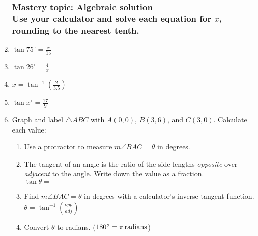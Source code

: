 \documentclass[12pt, twoside]{article}
\begin{document}
\begin{enumerate}
\subsubsection*{Mastery topic: Algebraic solution\\[0.5cm]
Use your calculator and solve each equation for $x$, rounding to the nearest tenth.}
\item $\displaystyle \tan 75^\circ = \frac{x}{15}$ \vspace{3cm}
\item $\displaystyle \tan 26^\circ = \frac{4}{x}$ \vspace{4cm}
\item $\displaystyle x = \tan^{-1} (\frac{2}{3.5})$ \vspace{3cm}
\item $\displaystyle \tan x^\circ = \frac{17}{9}$ \vspace{3cm}

\newpage
\item Graph and label $\triangle ABC$ with $A(0,0)$, $B(3,6)$, and $C(3,0)$. Calculate each value:
  \begin{enumerate}[itemsep=1.25cm]  
    \item Use a protractor to measure $m\angle BAC= \theta$ in degrees.
    \item The tangent of an angle is the ratio of the side lengths \emph{opposite} over \emph{adjacent} to the angle. Write down the value as a fraction.\\[0.5cm]
      $\tan  \theta=$
    \item Find $m\angle BAC=\theta$ in degrees with a calculator's inverse tangent function.\\ $\displaystyle \theta = \tan^{-1}(\frac{opp}{adj})$
    \item Convert $ \theta$ to radians. ($180^\circ=\pi \, \rm{radians}$)
  \end{enumerate}


\end{enumerate}
\end{document}
